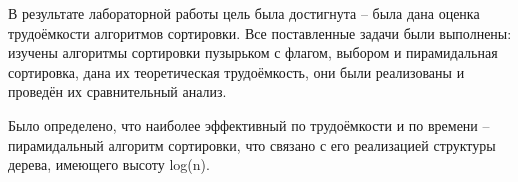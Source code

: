 \Conclusion %
В результате лабораторной работы цель была достигнута -- была дана оценка трудоёмкости алгоритмов сортировки. Все поставленные задачи были выполнены: изучены алгоритмы сортировки пузырьком с флагом, выбором и пирамидальная сортировка, дана их теоретическая трудоёмкость, они были реализованы и проведён их сравнительный анализ.
\par Было определено, что наиболее эффективный по трудоёмкости и по времени -- пирамидальный алгоритм сортировки, что связано с его реализацией структуры дерева, имеющего высоту log(n).